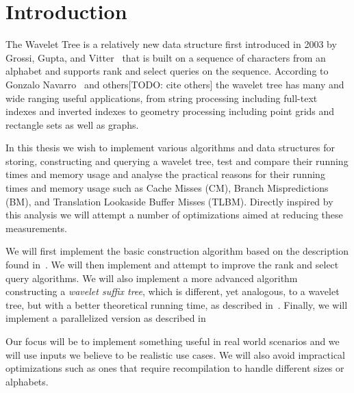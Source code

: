 \section{Introduction}
The Wavelet Tree is a relatively new data structure first introduced in 2003 by Grossi, Gupta, and Vitter~\cite{Grossi:2003:HET:644108.644250} that is built on a sequence of characters from an alphabet and supports rank and select queries on the sequence.
According to Gonzalo Navarro~\cite{Navjda13} and others[TODO: cite others] the wavelet tree has many and wide ranging useful applications, from string processing including full-text indexes and inverted indexes to geometry processing including point grids and rectangle sets as well as graphs.

In this thesis we wish to implement various algorithms and data structures for storing, constructing and querying a wavelet tree, test and compare their running times and memory usage and analyse the practical reasons for their running times and memory usage such as Cache Misses (CM), Branch Mispredictions (BM), and Translation Lookaside Buffer Misses (TLBM). Directly inspired by this analysis we will attempt a number of optimizations aimed at reducing these measurements.

We will first implement the basic construction algorithm based on the description found in~\citep{ Navjda13}.
We will then implement and attempt to improve the rank and select query algorithms.
We will also implement a more advanced algorithm constructing a \textit{wavelet suffix tree}, which is different, yet analogous, to a wavelet tree, but with a better theoretical running time, as described in~\citep{DBLP:journals/corr/BabenkoGKS14}. Finally, we will implement a parallelized version as described in~\citep{DBLP:journals/corr/Shun14}

Our focus will be to implement something useful in real world scenarios and we will use inputs we believe to be realistic use cases.
We will also avoid impractical optimizations such as ones that require recompilation to handle different sizes or alphabets.